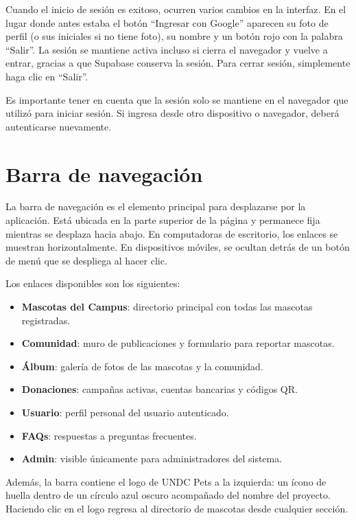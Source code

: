 \documentclass[12pt,a4paper]{article}
\begin{document}
Cuando el inicio de sesión es exitoso, ocurren varios cambios en la interfaz. En el lugar donde antes estaba el botón ``Ingresar con Google'' aparecen su foto de perfil (o sus iniciales si no tiene foto), su nombre y un botón rojo con la palabra ``Salir''. La sesión se mantiene activa incluso si cierra el navegador y vuelve a entrar, gracias a que Supabase conserva la sesión. Para cerrar sesión, simplemente haga clic en ``Salir''.

Es importante tener en cuenta que la sesión solo se mantiene en el navegador que utilizó para iniciar sesión. Si ingresa desde otro dispositivo o navegador, deberá autenticarse nuevamente.

\section{Barra de navegación}

La barra de navegación es el elemento principal para desplazarse por la aplicación. Está ubicada en la parte superior de la página y permanece fija mientras se desplaza hacia abajo. En computadoras de escritorio, los enlaces se muestran horizontalmente. En dispositivos móviles, se ocultan detrás de un botón de menú que se despliega al hacer clic.

Los enlaces disponibles son los siguientes:

\begin{itemize}
    \item \textbf{Mascotas del Campus}: directorio principal con todas las mascotas registradas.
    \item \textbf{Comunidad}: muro de publicaciones y formulario para reportar mascotas.
    \item \textbf{Álbum}: galería de fotos de las mascotas y la comunidad.
    \item \textbf{Donaciones}: campañas activas, cuentas bancarias y códigos QR.
    \item \textbf{Usuario}: perfil personal del usuario autenticado.
    \item \textbf{FAQs}: respuestas a preguntas frecuentes.
    \item \textbf{Admin}: visible únicamente para administradores del sistema.
\end{itemize}

Además, la barra contiene el logo de UNDC Pets a la izquierda: un ícono de huella dentro de un círculo azul oscuro acompañado del nombre del proyecto. Haciendo clic en el logo regresa al directorio de mascotas desde cualquier sección.
\end{document}
